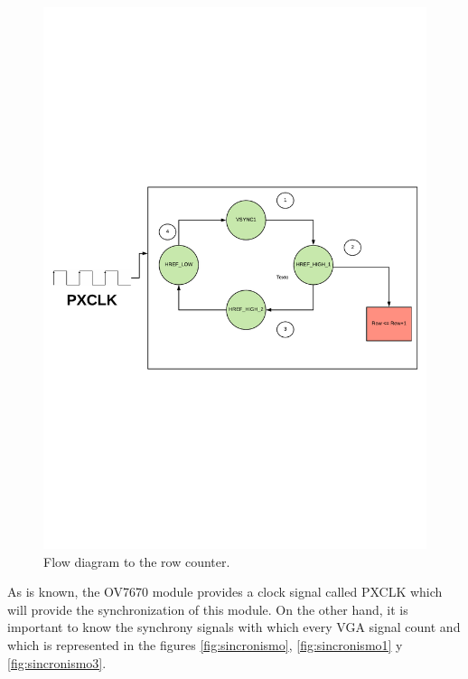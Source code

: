 	\begin{figure}[H]
		\center
		\includegraphics[trim = 0mm 8cm 0mm 8cm, clip,scale=0.5]{imagenes/Cuadricoptero_vision/row_counter.pdf}
		\caption{Flow diagram to the row counter.}
		\label{fig:row_counter}
	\end{figure}
	
	As is known, the OV7670 module provides a clock signal called PXCLK which will provide the synchronization of this module. On the other hand, it is important to know the synchrony signals with which every VGA signal count and which is represented in the figures \ref{fig:sincronismo}, \ref{fig:sincronismo1} y \ref{fig:sincronismo3}.
	
